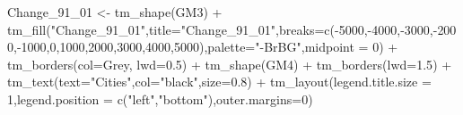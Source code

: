 \documentclass[
]{article}
\newenvironment{Shaded}{\begin{snugshade}}{\end{snugshade}}
\newcommand{\AttributeTok}[1]{\textcolor[rgb]{0.77,0.63,0.00}{#1}}
\newcommand{\DecValTok}[1]{\textcolor[rgb]{0.00,0.00,0.81}{#1}}
\newcommand{\FloatTok}[1]{\textcolor[rgb]{0.00,0.00,0.81}{#1}}
\newcommand{\FunctionTok}[1]{\textcolor[rgb]{0.00,0.00,0.00}{#1}}
\newcommand{\NormalTok}[1]{#1}
\newcommand{\OtherTok}[1]{\textcolor[rgb]{0.56,0.35,0.01}{#1}}
\newcommand{\SpecialCharTok}[1]{\textcolor[rgb]{0.00,0.00,0.00}{#1}}
\newcommand{\StringTok}[1]{\textcolor[rgb]{0.31,0.60,0.02}{#1}}
\begin{document}
\begin{Shaded}
\begin{Highlighting}[]
\NormalTok{Change\_91\_01 }\OtherTok{\textless{}{-}} \FunctionTok{tm\_shape}\NormalTok{(GM3) }\SpecialCharTok{+}
  \FunctionTok{tm\_fill}\NormalTok{(}\StringTok{"Change\_91\_01"}\NormalTok{,}\AttributeTok{title=}\StringTok{"Change\_91\_01"}\NormalTok{,}\AttributeTok{breaks=}\FunctionTok{c}\NormalTok{(}\SpecialCharTok{{-}}\DecValTok{5000}\NormalTok{,}\SpecialCharTok{{-}}\DecValTok{4000}\NormalTok{,}\SpecialCharTok{{-}}\DecValTok{3000}\NormalTok{,}\SpecialCharTok{{-}}\DecValTok{2000}\NormalTok{,}\SpecialCharTok{{-}}\DecValTok{1000}\NormalTok{,}\DecValTok{0}\NormalTok{,}\DecValTok{1000}\NormalTok{,}\DecValTok{2000}\NormalTok{,}\DecValTok{3000}\NormalTok{,}\DecValTok{4000}\NormalTok{,}\DecValTok{5000}\NormalTok{),}\AttributeTok{palette=}\StringTok{"{-}BrBG"}\NormalTok{,}\AttributeTok{midpoint =} \DecValTok{0}\NormalTok{) }\SpecialCharTok{+}
 \FunctionTok{tm\_borders}\NormalTok{(}\AttributeTok{col=}\StringTok{\textquotesingle{}Grey\textquotesingle{}}\NormalTok{, }\AttributeTok{lwd=}\FloatTok{0.5}\NormalTok{) }\SpecialCharTok{+}
\FunctionTok{tm\_shape}\NormalTok{(GM4) }\SpecialCharTok{+}
  \FunctionTok{tm\_borders}\NormalTok{(}\AttributeTok{lwd=}\FloatTok{1.5}\NormalTok{) }\SpecialCharTok{+}
  \FunctionTok{tm\_text}\NormalTok{(}\AttributeTok{text=}\StringTok{"Cities"}\NormalTok{,}\AttributeTok{col=}\StringTok{"black"}\NormalTok{,}\AttributeTok{size=}\FloatTok{0.8}\NormalTok{) }\SpecialCharTok{+}
\FunctionTok{tm\_layout}\NormalTok{(}\AttributeTok{legend.title.size =} \DecValTok{1}\NormalTok{,}\AttributeTok{legend.position =} \FunctionTok{c}\NormalTok{(}\StringTok{"left"}\NormalTok{,}\StringTok{"bottom"}\NormalTok{),}\AttributeTok{outer.margins=}\DecValTok{0}\NormalTok{)}


\end{Highlighting}
\end{Shaded}
\end{document}
